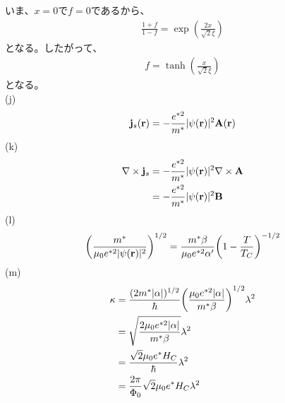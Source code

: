 \documentclass[a4paper,11pt]{jsarticle}
\numberwithin{equation}{section}
\begin{document}
いま、$x = 0$で$f = 0$であるから、
\begin{align}
  \frac{1+f}{1-f} = \exp(\frac{2x}{\sqrt{2}\xi})
\end{align}
となる。したがって、
\begin{align}
  f = \tanh(\frac{x}{\sqrt{2}\xi})
\end{align}
となる。\\
(j)\\
\begin{align}
  \vb{j}_s(\vb{r}) = -\frac{e^{*2}}{m^*}| \psi(\vb{r})|^2\vb{A}(\vb{r})
\end{align}
(k)\\
\begin{align}
  \nabla \times \vb{j}_s &= -\frac{e^{*2}}{m^*}| \psi(\vb{r})|^2\nabla \times \vb{A}\\
  &= -\frac{e^{*2}}{m^*}| \psi(\vb{r})|^2\vb{B}
\end{align}
(l)\\
\begin{align}
  \qty(\frac{m^*}{\mu_0e^{*2}| \psi(\vb{r})|^2})^{1/2} = \frac{m^* \beta}{\mu_0e^{*2}\alpha'}\qty(1-\frac{T}{T_C})^{-1/2}
\end{align}
(m)\\
\begin{align}
  \kappa &= \frac{(2m^*|\alpha|)^{1/2}}{\hbar} \qty(\frac{\mu_0e^{*2}|\alpha|}{m^*\beta})^{1/2} \lambda^2\\
  &= \sqrt{\frac{2\mu_0e^{*2}|\alpha|}{m^*\beta}}\lambda^2\\
  &= \frac{\sqrt{2}\mu_0e^{*}H_C}{\hbar}\lambda^2\\
  &= \frac{2\pi}{\Phi_0}\sqrt{2}\mu_0e^{*}H_C\lambda^2
\end{align}
\end{document}
